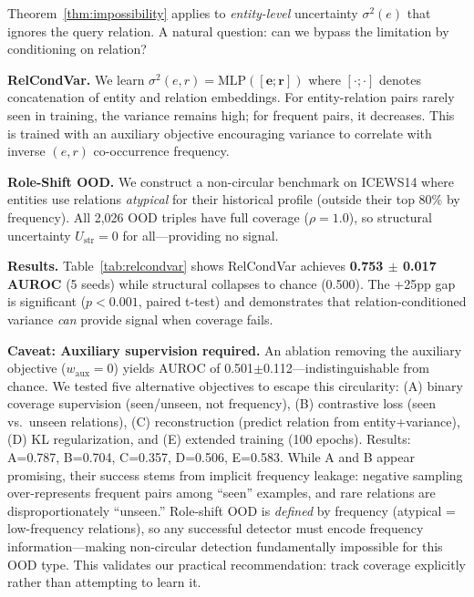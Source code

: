 Theorem~\ref{thm:impossibility} applies to \emph{entity-level} uncertainty $\sigma^2(e)$ that ignores the query relation. A natural question: can we bypass the limitation by conditioning on relation?

\textbf{RelCondVar.} We learn $\sigma^2(e, r) = \text{MLP}([\mathbf{e}; \mathbf{r}])$ where $[\cdot;\cdot]$ denotes concatenation of entity and relation embeddings. For entity-relation pairs rarely seen in training, the variance remains high; for frequent pairs, it decreases. This is trained with an auxiliary objective encouraging variance to correlate with inverse $(e, r)$ co-occurrence frequency.

\textbf{Role-Shift OOD.} We construct a non-circular benchmark on ICEWS14 where entities use relations \emph{atypical} for their historical profile (outside their top 80\% by frequency). All 2,026 OOD triples have full coverage ($\rho = 1.0$), so structural uncertainty $U_{\text{str}} = 0$ for all---providing no signal.

\textbf{Results.} Table~\ref{tab:relcondvar} shows RelCondVar achieves \textbf{0.753 $\pm$ 0.017 AUROC} (5 seeds) while structural collapses to chance (0.500). The +25pp gap is significant ($p < 0.001$, paired t-test) and demonstrates that relation-conditioned variance \emph{can} provide signal when coverage fails.

\textbf{Caveat: Auxiliary supervision required.} An ablation removing the auxiliary objective ($w_{\text{aux}}=0$) yields AUROC of 0.501$\pm$0.112---indistinguishable from chance. We tested five alternative objectives to escape this circularity: (A) binary coverage supervision (seen/unseen, not frequency), (B) contrastive loss (seen vs.\ unseen relations), (C) reconstruction (predict relation from entity+variance), (D) KL regularization, and (E) extended training (100 epochs). Results: A=0.787, B=0.704, C=0.357, D=0.506, E=0.583. While A and B appear promising, their success stems from implicit frequency leakage: negative sampling over-represents frequent pairs among ``seen'' examples, and rare relations are disproportionately ``unseen.'' Role-shift OOD is \emph{defined} by frequency (atypical = low-frequency relations), so any successful detector must encode frequency information---making non-circular detection fundamentally impossible for this OOD type. This validates our practical recommendation: track coverage explicitly rather than attempting to learn it.

